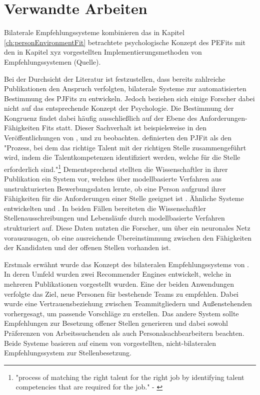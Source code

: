 \chapter{Verwandte Arbeiten}
\label{ch:verwandteArbeiten}
Bilaterale Empfehlungssysteme kombinieren das in Kapitel \ref{ch:personEnvironmentFit} betrachtete psychologische Konzept des \acp{PEFit} mit den in Kapitel xyz vorgestellten Implementierungsmethoden von Empfehlungssystemen (Quelle).

Bei der Durchsicht der Literatur ist festzustellen, dass bereits zahlreiche Publikationen den Anspruch verfolgten, bilaterale Systeme zur automatisierten Bestimmung des \acp{PJFit} zu entwickeln. Jedoch beziehen sich einige Forscher dabei nicht auf das entsprechende Konzept der Psychologie. Die Bestimmung der Kongruenz findet dabei häufig ausschließlich auf der Ebene des Anforderungen-Fähigkeiten Fits statt. Dieser Sachverhalt ist beispielsweise in den Veröffentlichungen von \textcite[S. 1ff.]{luo:2019}, \textcite[S. 1ff.]{qin:2018} und \textcite[S. 1ff.]{personJobFit:2018} zu beobachten. \textcite[S. 1, Z. 1f.]{personJobFit:2018} definierten den \ac{PJFit} als den "Prozess, bei dem das richtige Talent mit der richtigen Stelle zusammengeführt wird, indem die Talentkompetenzen identifiziert werden, welche für die Stelle erforderlich sind."\footnote{"process of matching the right talent for the right job by identifying talent competencies that are required for the job." - \textcite[S. 1, Z. 1f.]{personJobFit:2018}} Dementsprechend stellten die Wissenschaftler in ihrer Publikation ein System vor, welches über modellbasierte Verfahren aus unstrukturierten Bewerbungsdaten lernte, ob eine Person aufgrund ihrer Fähigkeiten für die Anforderungen einer Stelle geeignet ist \cite[S. 1ff.]{personJobFit:2018}. Ähnliche Systeme entwickelten \textcite[S. 1ff.]{qin:2018} und \textcite[S. 1ff.]{luo:2019}. In beiden Fällen bereiteten die Wissenschaftler Stellenausschreibungen und Lebensläufe durch modellbasierte Verfahren strukturiert auf. Diese Daten nutzten die Forscher, um über ein neuronales Netz vorauszusagen, ob eine ausreichende Übereinstimmung zwischen den Fähigkeiten der Kandidaten und der offenen Stellen vorhanden ist. 

Erstmals erwähnt wurde das Konzept des bilateralen Empfehlungssystems von \textcite{malinowski:2005}. In deren Umfeld wurden zwei Recommender Engines entwickelt, welche in mehreren Publikationen vorgestellt wurden. Eine der beiden Anwendungen verfolgte das Ziel, neue Personen für bestehende Teams zu empfehlen. Dabei wurde eine Vertrauensbeziehung zwischen Teammitgliedern und Außenstehenden vorhergesagt, um passende Vorschläge zu erstellen. Das andere System sollte Empfehlungen zur Besetzung offener Stellen generieren und dabei sowohl Präferenzen von Arbeitssuchenden als auch Personalsachbearbeitern beachten. Beide Systeme basieren auf einem von \textcite{faerber:2003} vorgestellten, nicht-bilateralen Empfehlungssystem zur Stellenbesetzung.

